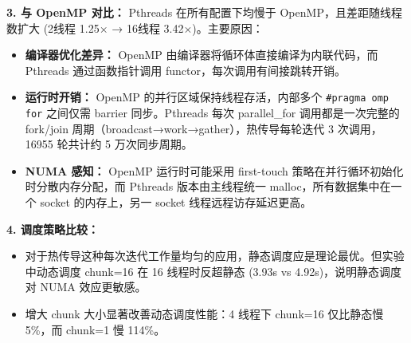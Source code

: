 \documentclass{SYSUReport}
\begin{document}
\textbf{3. 与 OpenMP 对比：} Pthreads 在所有配置下均慢于 OpenMP，且差距随线程数扩大 (2线程 1.25× → 16线程 3.42×)。主要原因：
\begin{itemize}
    \item \textbf{编译器优化差异：} OpenMP 由编译器将循环体直接编译为内联代码，而 Pthreads 通过函数指针调用 functor，每次调用有间接跳转开销。
    \item \textbf{运行时开销：} OpenMP 的并行区域保持线程存活，内部多个 \texttt{\#pragma omp for} 之间仅需 barrier 同步。Pthreads 每次 parallel\_for 调用都是一次完整的 fork/join 周期（broadcast→work→gather），热传导每轮迭代 3 次调用，16955 轮共计约 5 万次同步周期。
    \item \textbf{NUMA 感知：} OpenMP 运行时可能采用 first-touch 策略在并行循环初始化时分散内存分配，而 Pthreads 版本由主线程统一 malloc，所有数据集中在一个 socket 的内存上，另一 socket 线程远程访存延迟更高。
\end{itemize}

\textbf{4. 调度策略比较：}
\begin{itemize}
    \item 对于热传导这种每次迭代工作量均匀的应用，静态调度应是理论最优。但实验中动态调度 chunk=16 在 16 线程时反超静态 (3.93s vs 4.92s)，说明静态调度对 NUMA 效应更敏感。
    \item 增大 chunk 大小显著改善动态调度性能：4 线程下 chunk=16 仅比静态慢 5\%，而 chunk=1 慢 114\%。
\end{itemize}
\end{document}
